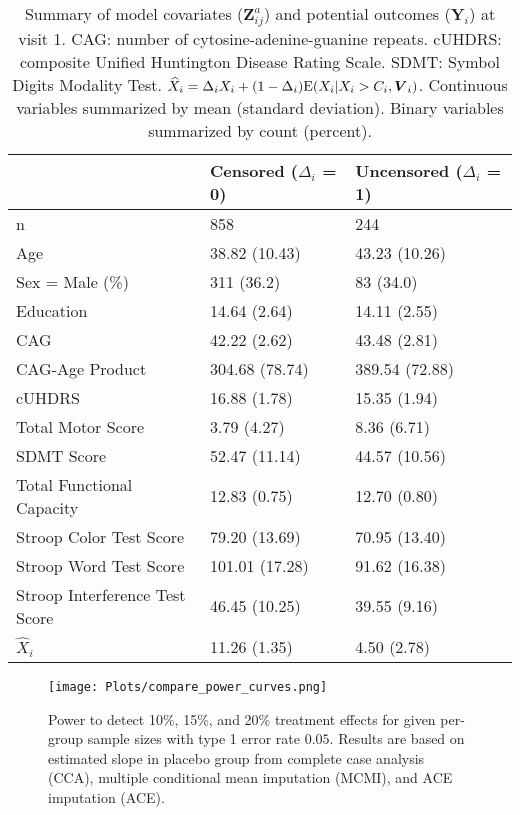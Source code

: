 \documentclass[12pt]{article}
\def\bV{{\boldsymbol V}}
\def\bY{{\boldsymbol Y}}
\def\bZ{{\boldsymbol Z}}
\begin{document}
\begin{table}[ht]
\footnotesize
\centering
\begin{tabular}{lll}
  \hline
 & Censored ($\Delta_i$ = 0) & Uncensored ($\Delta_i$ = 1)\\ 
  \hline
n & 858 & 244 \\ 
  Age & 38.82 (10.43) & 43.23 (10.26) \\ 
  Sex = Male (\%) & 311 (36.2) & 83 (34.0) \\ 
  Education & 14.64 (2.64) & 14.11 (2.55) \\ 
  CAG & 42.22 (2.62) & 43.48 (2.81) \\ 
  CAG-Age Product & 304.68 (78.74) & 389.54 (72.88) \\ 
  cUHDRS & 16.88 (1.78) & 15.35 (1.94) \\ 
  Total Motor Score & 3.79 (4.27) & 8.36 (6.71) \\ 
  SDMT Score & 52.47 (11.14) & 44.57 (10.56) \\ 
  Total Functional Capacity & 12.83 (0.75) & 12.70 (0.80) \\ 
  Stroop Color Test Score & 79.20 (13.69) & 70.95 (13.40) \\ 
  Stroop Word Test Score & 101.01 (17.28) & 91.62 (16.38) \\ 
  Stroop Interference Test Score & 46.45 (10.25) & 39.55 (9.16) \\ 
  $\widehat{X}_i$ & 11.26 (1.35) & 4.50 (2.78) \\
   \hline
\end{tabular}
\caption{Summary of model covariates ($\bZ^a_{ij}$) and potential outcomes ($\bY_i$) at visit 1. CAG: number of cytosine-adenine-guanine repeats. cUHDRS: composite Unified Huntington Disease Rating Scale. SDMT: Symbol Digits Modality Test.  $\widehat{X}_i=\Delta_iX_i+(1-\Delta_i){\rm E}(X_i|X_i>C_i,\bV_i)$. Continuous variables summarized by mean (standard deviation). Binary variables summarized by count (percent).}
\label{table:TableOne}
\end{table}

\begin{figure}
    \centering
    \texttt{[image: Plots/compare\_power\_curves.png]}
    \caption{Power to detect 10\%, 15\%, and 20\% treatment effects for given per-group sample sizes with type 1 error rate $0.05$. Results are based on estimated slope in placebo group from complete case analysis (CCA), multiple conditional mean imputation (MCMI), and ACE imputation (ACE).}
    \label{fig:power_curves}
\end{figure}
\end{document}
